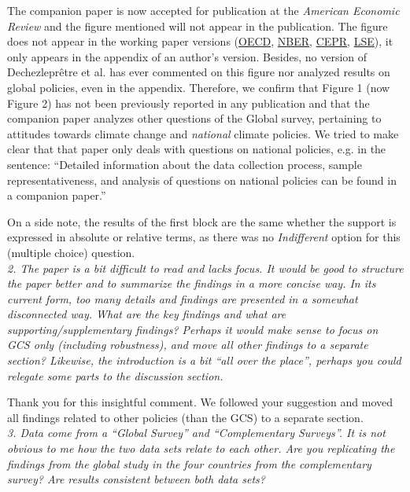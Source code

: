 \documentclass[12pt,english]{article}
\begin{document}
The companion paper is now accepted for publication at the \textit{American Economic Review} and the figure mentioned will not appear in the publication. The figure does not appear in the working paper versions (\href{https://www.oecd.org/climate-change/international-attitudes-toward-climate-policies/}{OECD}, \href{https://data.nber.org/data-appendix/w30265/International_Attitudes_Toward_Climate_Change_OA.pdf}{NBER}, \href{https://repec.cepr.org/repec/cpr/ceprdp/DP17602.pdf}{CEPR}, \href{https://www.lse.ac.uk/granthaminstitute/wp-content/uploads/2022/12/working-paper-384-Dechezlepretre-et-al.pdf}{LSE}), it only appears in the appendix of an author's version. Besides, no version of Dechezleprêtre et al. has ever commented on this figure nor analyzed results on global policies, even in the appendix. Therefore, we confirm that Figure 1 (now Figure 2) has not been previously reported in any publication and that the companion paper analyzes other questions of the Global survey, pertaining to attitudes towards climate change and \textit{national} climate policies. We tried to make clear that that paper only deals with questions on national policies, e.g. in the sentence: ``Detailed information about the data collection process, sample representativeness, and analysis of questions on national policies can be found in a companion paper.''

On a side note, the results of the first block are the same whether the support is expressed in absolute or relative terms, as there was no \textit{Indifferent} option for this (multiple choice) question.
~\\

\textit{2. The paper is a bit difficult to read and lacks focus. It would be good to structure the paper better and to summarize the findings in a more concise way. In its current form, too many details and findings are presented in a somewhat disconnected way. What are the key findings and what are supporting/supplementary findings? Perhaps it would make sense to focus on GCS only (including robustness), and move all other findings to a separate section? Likewise, the introduction is a bit “all over the place”, perhaps you could relegate some parts to the discussion section.}

Thank you for this insightful comment. We followed your suggestion and moved all findings related to other policies (than the GCS) to a separate section. %
~\\

\textit{3. Data come from a “Global Survey” and “Complementary Surveys”. It is not obvious to me how the two data sets relate to each other. Are you replicating the findings from the global study in the four countries from the complementary survey? Are results consistent between both data sets?}
\end{document}
